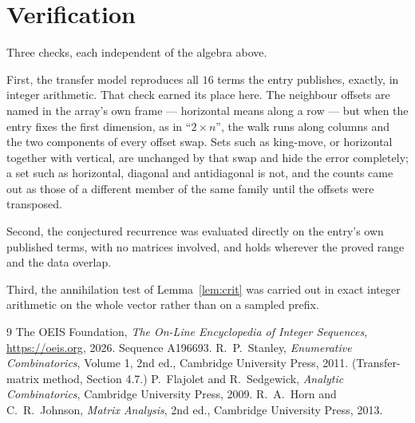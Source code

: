 \documentclass[11pt,a4paper]{article}
\theoremstyle{plain}
\theoremstyle{definition}
\begin{document}
\section{Verification}

Three checks, each independent of the algebra above.

First, the transfer model reproduces all $16$ terms the entry publishes, exactly, in
integer arithmetic. That check earned its place here. The neighbour offsets are named in the
array's own frame --- horizontal means along a row --- but when the entry fixes the first
dimension, as in ``$2\times n$'', the walk runs along columns and the two components of every
offset swap. Sets such as king-move, or horizontal together with vertical, are unchanged by
that swap and hide the error completely; a set such as horizontal, diagonal and antidiagonal
is not, and the counts came out as those of a different member of the same family until the
offsets were transposed.

Second, the conjectured recurrence was evaluated directly on the entry's own published terms,
with no matrices involved, and holds wherever the proved range and the data overlap.

Third, the annihilation test of Lemma~\ref{lem:crit} was carried out in exact integer
arithmetic on the whole vector rather than on a sampled prefix.

\begin{thebibliography}{9}
 The OEIS Foundation, \emph{The On-Line Encyclopedia of Integer
Sequences}, \url{https://oeis.org}, 2026. Sequence A196693.
 R.~P.~Stanley, \emph{Enumerative Combinatorics}, Volume 1, 2nd ed.,
Cambridge University Press, 2011. (Transfer-matrix method, Section 4.7.)
 P.~Flajolet and R.~Sedgewick, \emph{Analytic Combinatorics}, Cambridge
University Press, 2009.
 R.~A.~Horn and C.~R.~Johnson, \emph{Matrix Analysis}, 2nd ed., Cambridge
University Press, 2013.
\end{thebibliography}
\end{document}
